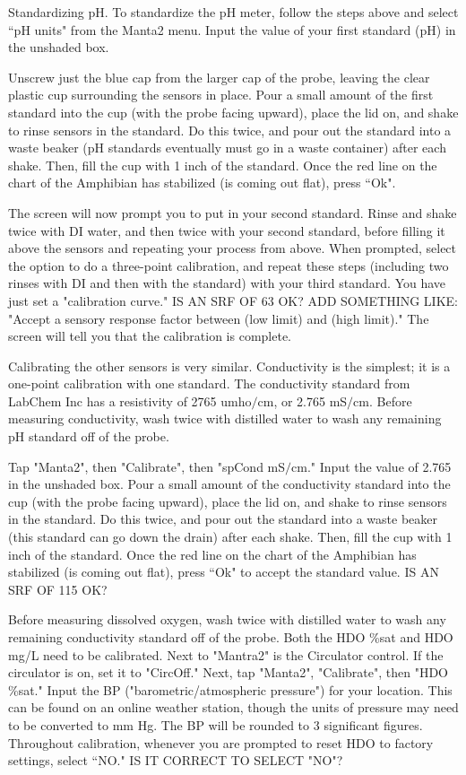 \documentclass[12pt]{../SOP3}\usepackage[]{graphicx}\usepackage[]{color}
\begin{document}
\NP Standardizing pH. To standardize the pH meter, follow the steps above and select ``pH units" from the Manta2 menu. Input the value of your first standard (pH) in the unshaded box. 

\NP Unscrew just the blue cap from the larger cap of the probe, leaving the clear plastic cup surrounding the sensors in place. Pour a small amount of the first standard into the cup (with the probe facing upward), place the lid on, and shake to rinse sensors in the standard. Do this twice, and pour out the standard into a waste beaker (pH standards eventually must go in a waste container) after each shake. Then, fill the cup with 1 inch of the standard. Once the red line on the chart of the Amphibian has stabilized (is coming out flat), press ``Ok". 

\NP The screen will now prompt you to put in your second standard. Rinse and shake twice with DI water, and then twice with your second standard, before filling it above the sensors and repeating your process from above. When prompted, select the option to do a three-point calibration, and repeat these steps (including two rinses with DI and then with the standard) with your third standard. You have just set a "calibration curve." IS AN SRF OF 63 OK? ADD SOMETHING LIKE: "Accept a sensory response factor between (low limit) and (high limit)." The screen will tell you that the calibration is complete.

\NP Calibrating the other sensors is very similar. Conductivity is the simplest; it is a one-point calibration with one standard. The conductivity standard from LabChem Inc has a resistivity of 2765 umho$/$cm, or 2.765 mS$/$cm.  Before measuring conductivity, wash twice with distilled water to wash any remaining pH standard off of the probe. 

\NP Tap "Manta2", then "Calibrate", then "spCond mS$/$cm." Input the value of 2.765 in the unshaded box. Pour a small amount of the conductivity standard into the cup (with the probe facing upward), place the lid on, and shake to rinse sensors in the standard. Do this twice, and pour out the standard into a waste beaker (this standard can go down the drain) after each shake. Then, fill the cup with 1 inch of the standard. Once the red line on the chart of the Amphibian has stabilized (is coming out flat), press ``Ok" to accept the standard value. IS AN SRF OF 115 OK?

\NP Before measuring dissolved oxygen, wash twice with distilled water to wash any remaining conductivity standard off of the probe. Both the HDO \%sat and HDO mg/L need to be calibrated. Next to "Mantra2" is the Circulator control. If the circulator is on, set it to "CircOff." Next, tap "Manta2", "Calibrate", then "HDO \%sat." Input the BP ("barometric/atmospheric pressure") for your location. This can be found on an online weather station, though the units of pressure may need to be converted to mm Hg. The BP will be rounded to 3 significant figures. Throughout calibration, whenever you are prompted to reset HDO to factory settings, select “NO." IS IT CORRECT TO SELECT "NO"? 
\end{document}
